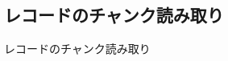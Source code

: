 \documentclass[../../../main]{subfiles}
\begin{document}
    \subsection{レコードのチャンク読み取り}\label{subsec:phraseology-record_chunk_read}

    レコードのチャンク読み取り
\end{document}
